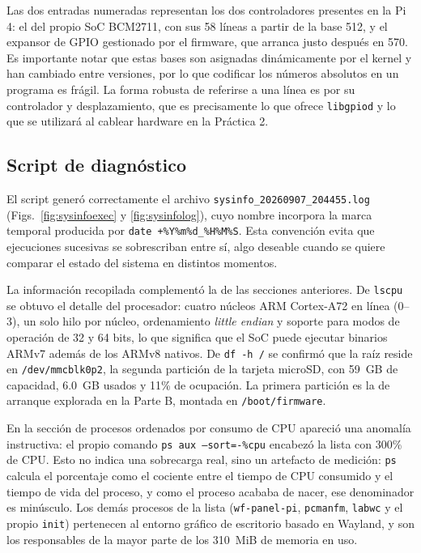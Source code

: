 \documentclass[conference]{IEEEtran}
\begin{document}
Las dos entradas numeradas representan los dos controladores presentes en la Pi 4: el del propio SoC BCM2711, con sus 58 líneas a partir de la base 512, y el expansor de GPIO gestionado por el firmware, que arranca justo después en 570. Es importante notar que estas bases son asignadas dinámicamente por el kernel y han cambiado entre versiones, por lo que codificar los números absolutos en un programa es frágil. La forma robusta de referirse a una línea es por su controlador y desplazamiento, que es precisamente lo que ofrece \texttt{libgpiod} y lo que se utilizará al cablear hardware en la Práctica 2.

\subsection{Script de diagnóstico}
El script generó correctamente el archivo \texttt{sysinfo\_20260907\_204455.log} (Figs.~\ref{fig:sysinfoexec} y \ref{fig:sysinfolog}), cuyo nombre incorpora la marca temporal producida por \texttt{date +\%Y\%m\%d\_\%H\%M\%S}. Esta convención evita que ejecuciones sucesivas se sobrescriban entre sí, algo deseable cuando se quiere comparar el estado del sistema en distintos momentos.

La información recopilada complementó la de las secciones anteriores. De \texttt{lscpu} se obtuvo el detalle del procesador: cuatro núcleos ARM Cortex-A72 en línea (0--3), un solo hilo por núcleo, ordenamiento \textit{little endian} y soporte para modos de operación de 32 y 64 bits, lo que significa que el SoC puede ejecutar binarios ARMv7 además de los ARMv8 nativos. De \texttt{df -h /} se confirmó que la raíz reside en \texttt{/dev/mmcblk0p2}, la segunda partición de la tarjeta microSD, con 59~GB de capacidad, 6.0~GB usados y 11\% de ocupación. La primera partición es la de arranque explorada en la Parte B, montada en \texttt{/boot/firmware}.

En la sección de procesos ordenados por consumo de CPU apareció una anomalía instructiva: el propio comando \texttt{ps aux --sort=-\%cpu} encabezó la lista con 300\% de CPU. Esto no indica una sobrecarga real, sino un artefacto de medición: \texttt{ps} calcula el porcentaje como el cociente entre el tiempo de CPU consumido y el tiempo de vida del proceso, y como el proceso acababa de nacer, ese denominador es minúsculo. Los demás procesos de la lista (\texttt{wf-panel-pi}, \texttt{pcmanfm}, \texttt{labwc} y el propio \texttt{init}) pertenecen al entorno gráfico de escritorio basado en Wayland, y son los responsables de la mayor parte de los 310~MiB de memoria en uso.
\end{document}
